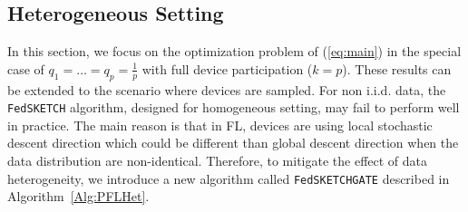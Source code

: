 \documentclass[twoside]{article}
\begin{document}
\subsection{Heterogeneous Setting}
\vspace{-0.05in}
In this section, we focus on the optimization problem of (\ref{eq:main}) in the special case of $q_1=\ldots=q_p=\frac{1}{p}$ with full device participation ($k=p$). 
These results can be extended to the scenario where devices are sampled.
For non i.i.d. data, the \texttt{FedSKETCH} algorithm, designed for homogeneous setting, may fail to perform well in practice. 
The main reason is that in FL, devices are using local stochastic descent direction which could be different than global descent direction when the data distribution are non-identical. 
Therefore, to mitigate the effect of data heterogeneity, we introduce a new algorithm called \texttt{FedSKETCHGATE} described in Algorithm~\ref{Alg:PFLHet}. 
\end{document}
